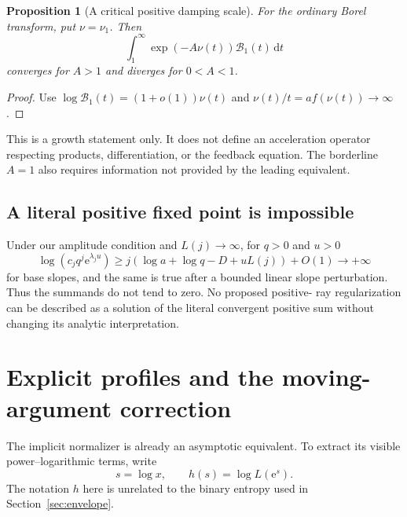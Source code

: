 \documentclass[11pt,a4paper]{article}
\numberwithin{equation}{section}
\newtheorem{proposition}[theorem]{Proposition}
\theoremstyle{definition}
\theoremstyle{remark}
\newcommand{\Bcal}{\mathcal B}
\newcommand{\ee}{\mathrm e}
\newcommand{\dd}{\,\mathrm d}
\begin{document}
\begin{proposition}[A critical positive damping scale]
\label{prop:damping}
For the ordinary Borel transform, put $\nu=\nu_1$. Then
\[
 \int_1^\infty\exp(-A\nu(t))\Bcal_1(t)\dd t
\]
converges for $A>1$ and diverges for $0<A<1$.
\end{proposition}
\begin{proof}
Use $\log\Bcal_1(t)=(1+o(1))\nu(t)$ and
$\nu(t)/t=af(\nu(t))\to\infty$.
\end{proof}
This is a growth statement only. It does not define an acceleration
operator respecting products, differentiation, or the feedback equation.
The borderline $A=1$ also requires information not provided by the
leading equivalent.

\subsection{A literal positive fixed point is impossible}
Under our amplitude condition and $L(j)\to\infty$, for $q>0$ and $u>0$
\[
 \log(c_jq^j\ee^{\lambda_ju})
 \ge j(\log a+\log q-D+uL(j))+O(1)\longrightarrow+\infty
\]
for base slopes, and the same is true after a bounded linear slope
perturbation. Thus the summands do not tend to zero. No proposed positive-
ray regularization can be described as a solution of the literal
convergent positive sum without changing its analytic interpretation.

\section{Explicit profiles and the moving-argument correction}
\label{sec:examples}

The implicit normalizer is already an asymptotic equivalent. To extract
its visible power--logarithmic terms, write
\begin{equation}
 s=\log x,\qquad h(s)=\log L(\ee^s).
 \label{eq:h-profile}
\end{equation}
The notation $h$ here is unrelated to the binary entropy used in
Section~\ref{sec:envelope}.
\end{document}
